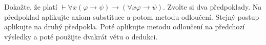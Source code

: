 \subsubsection{}
Dokažte, že platí $\vdash \forall x(\varphi \rightarrow\psi) \rightarrow
(\forall x \varphi \rightarrow \psi)$. Zvolte si dva předpoklady. Na předpoklad
aplikujte axiom substituce a potom metodu odloučení. Stejný postup aplikujte na
druhý předpokla. Poté aplikujte metodu odloučení na předchozí výsledky a poté
použijte dvakrát větu o dedukci.
